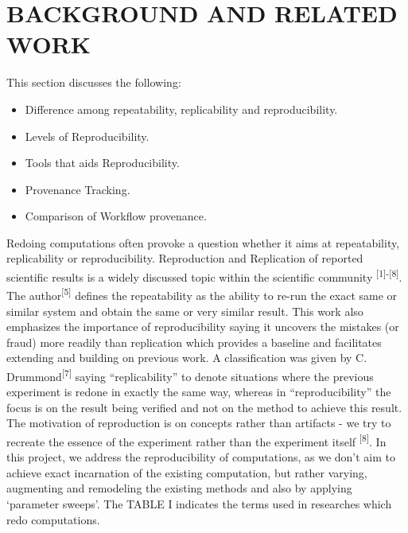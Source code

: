 \documentclass[6pt,,a4paper]{article}
\begin{document}
\section{\textbf{BACKGROUND AND RELATED WORK}}
This section discusses the following:
\begin{itemize} \label{data}
       \item Difference among repeatability, replicability and reproducibility.
        \item Levels of Reproducibility.
          \item Tools that aids Reproducibility.
	 \item Provenance Tracking.
	 \item Comparison of Workflow provenance.
\end{itemize}
Redoing computations often provoke a question whether it aims at repeatability, replicability or reproducibility. Reproduction and Replication of reported scientific results is a widely discussed topic within the scientific community \textsuperscript{[1]-[8]}. The author\textsuperscript{[5]} defines the repeatability as the ability to re-run the exact same or similar system and obtain the same or very similar result. This work also emphasizes the importance of reproducibility saying it uncovers the mistakes (or fraud) more readily than replication which provides a baseline and facilitates extending and building on previous work. A classification was given by C. Drummond\textsuperscript{[7]} saying “replicability” to denote situations where the previous experiment is redone in exactly the same way, whereas in “reproducibility” the focus is on the result being verified and not on the method to achieve this result. The motivation of reproduction is on concepts rather than artifacts - we try to recreate the essence of the experiment rather than the experiment itself \textsuperscript{[8]}. In this project, we address the reproducibility of computations, as we don’t aim to achieve exact incarnation of the existing computation, but rather varying, augmenting and remodeling the existing methods and also by applying ‘parameter sweeps’. The TABLE I  indicates the terms used in researches which redo computations.
\end{document}
